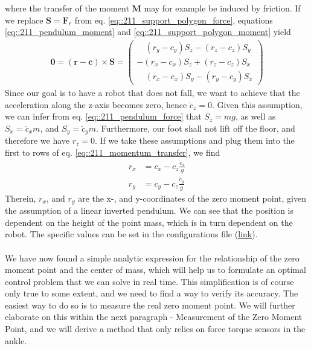 where the transfer of the moment $\bm{M}$ may for example be induced by friction. If we replace $\bm{S}=\bm{F}_r$ from eq. \ref{eq::211_support_polygon_force}, equations \ref{eq::211_pendulum_moment} and \ref{eq::211_support_polygon_moment} yield 
\begin{align}
	\bm{0} = (\bm{r}-\bm{c})\times\bm{S} = \begin{pmatrix}
	\quad(r_y - c_y)S_z - (r_z - c_z)S_y \\
	-(r_x - c_x)S_z + (r_z - c_z)S_x \\
	\quad(r_x - c_x)S_y - (r_y - c_y)S_x
	\end{pmatrix}
	\label{eq::211_momentum_transfer}
\end{align}
Since our goal is to have a robot that does not fall, we want to achieve that the acceleration along the z-axis becomes zero, hence $\ddot{c}_z=0$. Given this assumption, we can infer from eq. \ref{eq::211_pendulum_force} that $S_z=mg$, as well as $S_x = \ddot{c}_xm$, and $S_y = \ddot{c}_ym$. Furthermore, our foot shall not lift off the floor, and therefore we have $r_z=0$. If we take these assumptions and plug them into the first to rows of eq. \ref{eq::211_momentum_transfer}, we find
\begin{align}
	r_x &= c_x - c_z\frac{\ddot{c}_x}{g}
	\label{eq::211_zmp_x}\\
	r_y &= c_y - c_z\frac{\ddot{c}_y}{g}
	\label{eq::211_zmp_y}
\end{align}
Therein, $r_x$, and $r_y$ are the x-, and y-coordinates of the zero moment point, given the assumption of a linear inverted pendulum. We can see that the position is dependent on the height of the point mass, which is in turn dependent on the robot. The specific values can be set in the configurations file (\href{https://github.com/mhubii/nmpc_pattern_generator/blob/bc79a6d4f9bcfd3794146355af44429f5b7a9fe0/libs/pattern_generator/configs.yaml#L27}{\underline{link}}).
\\\\
We have now found a simple analytic expression for the relationship of the zero moment point and the center of mass, which will help us to formulate an optimal control problem that we can solve in real time. This simplification is of course only true to some extent, and we need to find a way to verify its accuracy. The easiest way to do so is to measure the real zero moment point. We will further elaborate on this within the next paragraph - Measurement of the Zero Moment Point, and we will derive a method that only relies on force torque sensors in the ankle.
\FloatBarrier
